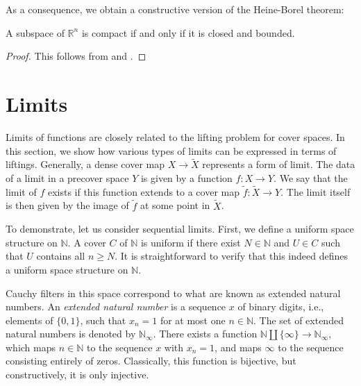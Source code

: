 \documentclass[pdflatex,sn-mathphys-num]{sn-jnl}
\theoremstyle{definition}
\theoremstyle{remark}
\numberwithin{figure}{section}
\begin{document}
As a consequence, we obtain a constructive version of the Heine-Borel theorem:

\begin{cor}
A subspace of $\mathbb{R}^n$ is compact if and only if it is closed and bounded.
\end{cor}
\begin{proof}
This follows from  and .
\end{proof}

\section{Limits}
\label{sec:limits}

Limits of functions are closely related to the lifting problem for cover spaces.
In this section, we show how various types of limits can be expressed in terms of liftings.
Generally, a dense cover map $X \to \widetilde{X}$ represents a form of limit.
The data of a limit in a precover space $Y$ is given by a function $f : X \to Y$.
We say that the limit of $f$ exists if this function extends to a cover map $\widetilde{f} : \widetilde{X} \to Y$.
The limit itself is then given by the image of $\widetilde{f}$ at some point in $\widetilde{X}$.

To demonstrate, let us consider sequential limits.
First, we define a uniform space structure on $\mathbb{N}$.
A cover $C$ of $\mathbb{N}$ is uniform if there exist $N \in \mathbb{N}$ and $U \in C$ such that $U$ contains all $n \geq N$.
It is straightforward to verify that this indeed defines a uniform space structure on $\mathbb{N}$.

Cauchy filters in this space correspond to what are known as extended natural numbers.
An \emph{extended natural number} is a sequence $x$ of binary digits, i.e., elements of $\{ 0, 1 \}$, such that $x_n = 1$ for at most one $n \in \mathbb{N}$.
The set of extended natural numbers is denoted by $\mathbb{N}_\infty$.
There exists a function $\mathbb{N} \amalg \{ \infty \} \to \mathbb{N}_\infty$, which maps $n \in \mathbb{N}$ to the sequence $x$ with $x_n = 1$, and maps $\infty$ to the sequence consisting entirely of zeros.
Classically, this function is bijective, but constructively, it is only injective.
\end{document}
